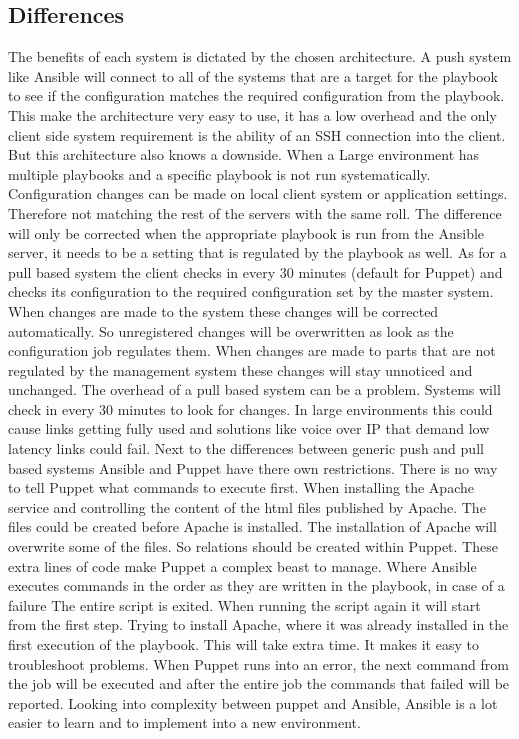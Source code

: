 \subsection{Differences}\label{subsec:differences}
The benefits of each system is dictated by the chosen architecture. A push system like Ansible will connect to all of the systems that are a target for the playbook to see if the configuration matches the required configuration from the playbook. This make the architecture very easy to use, it has a low overhead and the only client side system requirement is the ability of an SSH connection into the client. But this architecture also knows a downside. When a Large environment has multiple playbooks and a specific playbook is not run systematically. Configuration changes can be made on local client system or application settings. Therefore not matching the rest of the servers with the same roll. The difference will only be corrected when the appropriate playbook is run from the Ansible server, it needs to be a setting that is regulated by the playbook as well. As for a pull based system the client checks in every 30 minutes (default for Puppet) and checks its configuration to the required configuration set by the master system. When changes are made to the system these changes will be corrected automatically. So unregistered changes will be overwritten as look as the configuration job regulates them. When changes are made to parts that are not regulated by the management system these changes will stay unnoticed and unchanged. The overhead of a pull based system can be a problem. Systems will check in every 30 minutes to look for changes. In large environments this could cause links getting fully used and solutions like voice over IP that demand low latency links could fail. Next to the differences between generic push and pull based systems Ansible and Puppet have there own restrictions. There is no way to tell Puppet what commands to execute first. When installing the Apache service and controlling the content of the html files published by Apache. The files could be created before Apache is installed. The installation of Apache will overwrite some of the files. So relations should be created within Puppet. These extra lines of code make Puppet a complex beast to manage. Where Ansible executes commands in the order as they are written in the playbook, in case of a failure The entire script is exited. When running the script again it will start from the first step. Trying to install Apache, where it was already installed in the first execution of the playbook. This will take extra time. It makes it easy to troubleshoot problems. When Puppet runs into an error, the next command from the job will be executed and after the entire job the commands that failed will be reported. Looking into complexity between puppet and Ansible, Ansible is a lot easier to learn and to implement into a new environment.  


